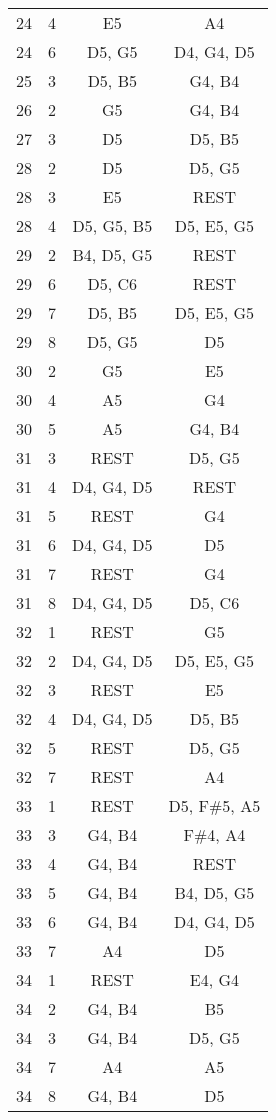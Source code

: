 \documentclass{article}
\begin{document}
\begin{longtable}{|c|c|c|c|}
24 & 4 & E5 & A4 \\ 
24 & 6 & D5, G5 & D4, G4, D5 \\ 
\hline
25 & 3 & D5, B5 & G4, B4 \\ 
\hline
26 & 2 & G5 & G4, B4 \\ 
\hline
27 & 3 & D5 & D5, B5 \\ 
\hline
28 & 2 & D5 & D5, G5 \\ 
28 & 3 & E5 & REST \\ 
28 & 4 & D5, G5, B5 & D5, E5, G5 \\ 
\hline
29 & 2 & B4, D5, G5 & REST \\ 
29 & 6 & D5, C6 & REST \\ 
29 & 7 & D5, B5 & D5, E5, G5 \\ 
29 & 8 & D5, G5 & D5 \\ 
\hline
30 & 2 & G5 & E5 \\ 
30 & 4 & A5 & G4 \\ 
30 & 5 & A5 & G4, B4 \\ 
\hline
31 & 3 & REST & D5, G5 \\ 
31 & 4 & D4, G4, D5 & REST \\ 
31 & 5 & REST & G4 \\ 
31 & 6 & D4, G4, D5 & D5 \\ 
31 & 7 & REST & G4 \\ 
31 & 8 & D4, G4, D5 & D5, C6 \\ 
\hline
32 & 1 & REST & G5 \\ 
32 & 2 & D4, G4, D5 & D5, E5, G5 \\ 
32 & 3 & REST & E5 \\ 
32 & 4 & D4, G4, D5 & D5, B5 \\ 
32 & 5 & REST & D5, G5 \\ 
32 & 7 & REST & A4 \\ 
\hline
33 & 1 & REST & D5, F\#5, A5 \\ 
33 & 3 & G4, B4 & F\#4, A4 \\ 
33 & 4 & G4, B4 & REST \\ 
33 & 5 & G4, B4 & B4, D5, G5 \\ 
33 & 6 & G4, B4 & D4, G4, D5 \\ 
33 & 7 & A4 & D5 \\ 
\hline
34 & 1 & REST & E4, G4 \\ 
34 & 2 & G4, B4 & B5 \\ 
34 & 3 & G4, B4 & D5, G5 \\ 
34 & 7 & A4 & A5 \\ 
34 & 8 & G4, B4 & D5 \\ 

\end{longtable}
\end{document}
